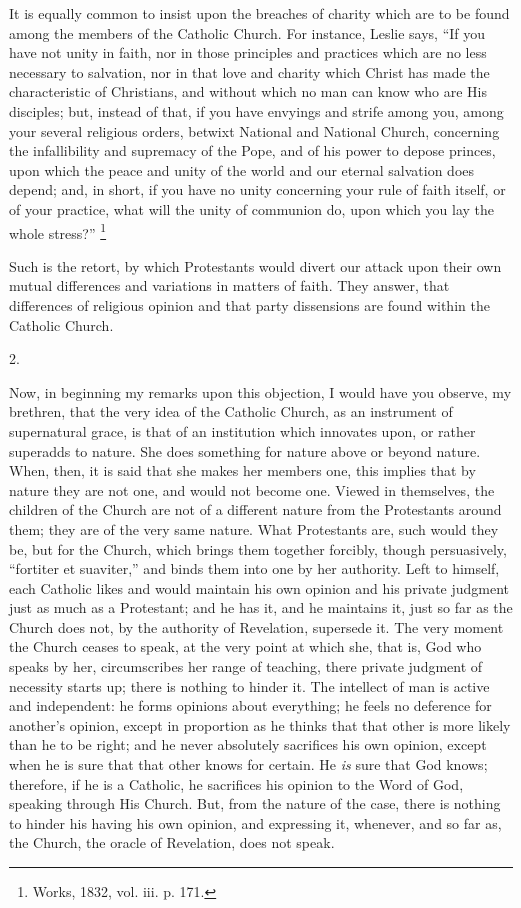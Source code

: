 It is equally common to insist upon the breaches of charity which
are to be found among the members of the Catholic Church. For
instance, Leslie says, ``If you have not unity in faith, nor in
those principles and practices which are no less necessary to
salvation, nor in that love and charity which Christ has made the
characteristic of Christians, and without which no man can know who
are His disciples; but, instead of that, if you have envyings and
strife among you, among your several religious orders, betwixt
National and National Church, concerning the infallibility and
supremacy of the Pope, and of his power to depose princes, upon which
the peace and unity of the world and our eternal salvation does
depend; and, in short, if you have no unity concerning your rule of
faith itself, or of your practice, what will the unity of communion
do, upon which you lay the whole stress?'' \footnote{Works, 1832, vol. iii. p. 171.}

Such is the retort, by which Protestants would divert our attack
upon their own mutual differences and variations in matters of faith.
They answer, that differences of religious opinion and that party
dissensions are found within the Catholic Church.

2.

Now, in beginning my remarks upon this objection, I would have you
observe, my brethren, that the very idea of the Catholic Church, as an
instrument of supernatural grace, is that of an institution which
innovates upon, or rather superadds to nature. She does something for
nature above or beyond nature. When, then, it is said that she makes
her members one, this implies that by nature they are not one, and
would not become one. Viewed in themselves, the children of the Church
are not of a different nature from the Protestants around them; they
are of the very same nature. What Protestants are, such would they be,
but for the Church, which brings them together forcibly, though
persuasively, ``fortiter et suaviter,'' and binds them into
one by her authority. Left to himself, each Catholic likes and would
maintain his own opinion and his private judgment just as much as a
Protestant; and he has it, and he maintains it, just so far as the
Church does not, by the authority of Revelation, supersede it. The
very moment the Church ceases to speak, at the very point at which
she, that is, God who speaks by her, circumscribes her range of
teaching, there private judgment of necessity starts up; there is
nothing to hinder it. The intellect of man is active and independent:
he forms opinions about everything; he feels no deference for
another's opinion, except in proportion as he thinks that that other
is more likely than he to be right; and he never absolutely sacrifices
his own opinion, except when he is sure that that other knows for
certain. He \emph{is} sure that God knows; therefore, if he is a
Catholic, he sacrifices his opinion to the Word of God, speaking
through His Church. But, from the nature of the case, there is nothing
to hinder his having his own opinion, and expressing it, whenever, and
so far as, the Church, the oracle of Revelation, does not speak.

